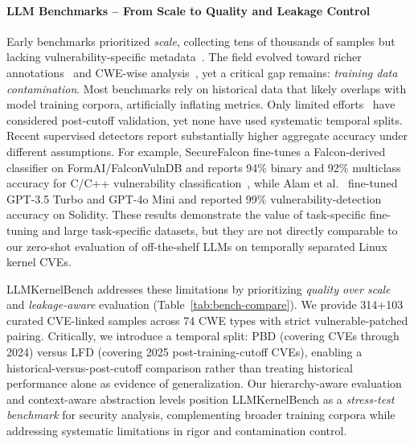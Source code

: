 \documentclass[lettersize,journal]{IEEEtran}
\begin{document}
\paragraph*{LLM Benchmarks -- From Scale to Quality and Leakage Control}
Early benchmarks prioritized \emph{scale}, collecting tens of thousands of samples but lacking vulnerability-specific metadata~\cite{lu2021codexglue, zhou2019devign}. The field evolved toward richer annotations~\cite{siddiq2022securityeval, liu2024vuldetectbench, sun2024llm4vuln} and CWE-wise analysis~\cite{khare2025understanding, ullah2024llms}, yet a critical gap remains: \emph{training data contamination}. Most benchmarks rely on historical data that likely overlaps with model training corpora, artificially inflating metrics. Only limited efforts~\cite{ullah2024llms} have considered post-cutoff validation, yet none have used systematic temporal splits. Recent supervised detectors report substantially higher aggregate accuracy under different assumptions. For example, SecureFalcon fine-tunes a Falcon-derived classifier on FormAI/FalconVulnDB and reports 94\% binary and 92\% multiclass accuracy for C/C++ vulnerability classification~\cite{ferrag2025securefalcon}, while Alam et al.~\cite{alam2024detection} fine-tuned GPT-3.5 Turbo and GPT-4o Mini and reported 99\% vulnerability-detection accuracy on Solidity. These results demonstrate the value of task-specific fine-tuning and large task-specific datasets, but they are not directly comparable to our zero-shot evaluation of off-the-shelf LLMs on temporally separated Linux kernel CVEs.

LLMKernelBench addresses these limitations by prioritizing \emph{quality over scale} and \emph{leakage-aware} evaluation (Table~\ref{tab:bench-compare}). We provide 314+103 curated CVE-linked samples across 74 \gls{CWE} types with strict vulnerable-patched pairing. Critically, we introduce a temporal split: \gls{PBD} (covering CVEs through 2024) versus \gls{LFD} (covering 2025 post-training-cutoff CVEs), enabling a historical-versus-post-cutoff comparison rather than treating historical performance alone as evidence of generalization. Our hierarchy-aware evaluation and context-aware abstraction levels position LLMKernelBench as a \emph{stress-test benchmark} for security analysis, complementing broader training corpora while addressing systematic limitations in rigor and contamination control.
\end{document}
